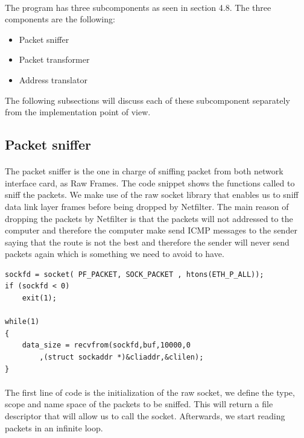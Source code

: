 \documentclass[oneside,12pt,a4paper,final]{book}
\begin{document}
\paragraph{}
The program has three subcomponents as seen in section 4.8. The three components are the following:
\begin{itemize}
\item Packet sniffer
\item Packet transformer
\item Address translator
\end{itemize}
The following subsections will discuss each of these subcomponent separately from the implementation point of view.

\subsection{Packet sniffer}
\paragraph{}
The packet sniffer is the one in charge of sniffing packet from both network interface card, as Raw Frames. The code snippet shows the functions called to sniff the packets. We make use of the raw socket library that enables us to sniff data link layer frames before being dropped by Netfilter.
The main reason of dropping the packets by Netfilter is that the packets will not addressed to the computer and therefore the computer make send ICMP messages to the sender saying that the route is not the best and therefore the sender will never send packets again which is something we need to avoid to have.

\begin{lstlisting}
sockfd = socket( PF_PACKET, SOCK_PACKET , htons(ETH_P_ALL));
if (sockfd < 0)
	exit(1);
	
while(1)
{
	data_size = recvfrom(sockfd,buf,10000,0
		,(struct sockaddr *)&cliaddr,&clilen);
}

\end{lstlisting}
\paragraph{}
The first line of code is the initialization of the raw socket, we define the type, scope and name space of the packets to be sniffed. This will return a file descriptor that will allow us to call the socket. Afterwards, we start reading packets in an infinite loop.
\end{document}
